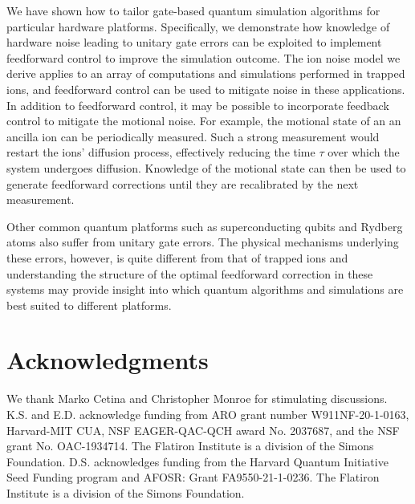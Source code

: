 \documentclass[prx,aps,twocolumn,showpacs,superscriptaddress,10pt]{revtex4-1}
\begin{document}
We have shown how to tailor gate-based quantum simulation algorithms for particular hardware platforms. Specifically, we demonstrate how knowledge of hardware noise leading to unitary gate errors can be exploited to implement feedforward control to improve the simulation outcome. The ion noise model we derive applies to an array of computations and simulations performed in trapped ions, and feedforward control can be used to mitigate noise in these applications. In addition to feedforward control, it may be possible to incorporate feedback control to mitigate the motional noise. For example, the motional state of an an ancilla ion can be periodically measured. Such a strong measurement would restart the ions' diffusion process, effectively reducing the time $\tau$ over which the system undergoes diffusion. Knowledge of the motional state can then be used to generate feedforward corrections until they are recalibrated by the next measurement. 

Other common quantum platforms such as superconducting qubits and Rydberg atoms also suffer from unitary gate errors. The physical mechanisms underlying these errors, however, is quite different from that of trapped ions and understanding the structure of the optimal feedforward correction in these systems may provide insight into which quantum algorithms and simulations are best suited to different platforms.\\

\section*{Acknowledgments}
\label{sec:Acknowledgments}
We thank Marko Cetina and Christopher Monroe for stimulating discussions. K.S. and E.D. acknowledge funding from ARO grant number W911NF-20-1-0163, Harvard-MIT CUA, NSF EAGER-QAC-QCH award No. 2037687, and the NSF grant No. OAC-1934714. The Flatiron Institute is a division of the Simons Foundation. D.S. acknowledges funding from the Harvard Quantum Initiative Seed Funding program and AFOSR: Grant FA9550-21-1-0236. The Flatiron Institute is a division of the Simons Foundation.
\end{document}
